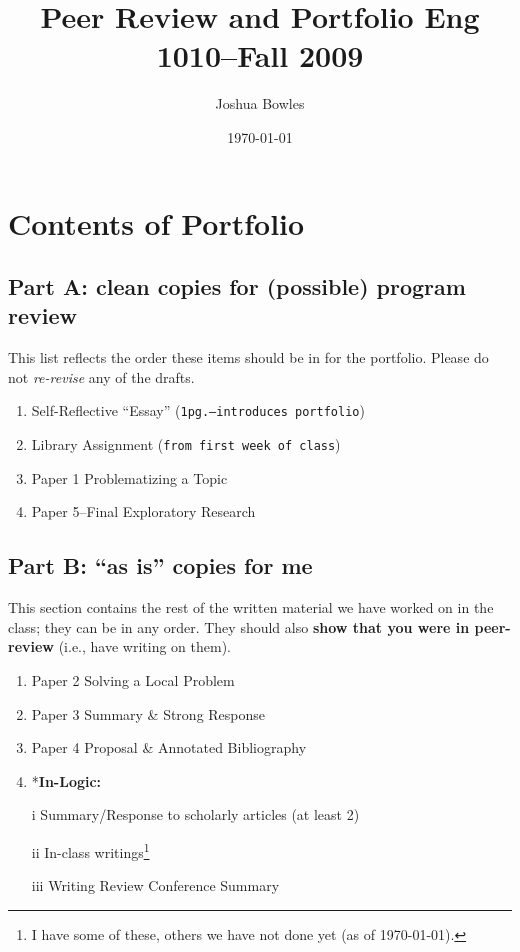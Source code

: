 \documentclass{article}
\theoremstyle{definition}
\begin{document}
\author{Joshua Bowles}
\title{Peer Review and Portfolio Eng 1010--Fall 2009}
\date{\today}

\maketitle

\section{Contents of Portfolio}
\subsection{Part A: clean copies for (possible) program review}
This list reflects the order these items should be in for the portfolio. Please do not \textsl{re-revise} any of the drafts.
\begin{enumerate}
\item Self-Reflective ``Essay'' (\texttt{1pg.--introduces portfolio})
\item Library Assignment (\texttt{from first week of class})
\item Paper 1 {\sc Problematizing a Topic}
\item Paper 5--Final {\sc Exploratory Research}
\end{enumerate}

\subsection{Part B: ``as is'' copies for me}
This section contains the rest of the written material we have worked on in the class; they can be in any order. They should also \textbf{show that you were in peer-review} (i.e., have writing on them).
\begin{enumerate}
\item Paper 2 {\sc Solving a Local Problem}
\item Paper 3 {\sc Summary \& Strong Response}
\item Paper 4 {\sc Proposal \& Annotated Bibliography}
\item *{\bf In-Logic:}
\item[i] Summary/Response to scholarly articles (at least 2)
\item[ii] In-class writings\footnote{I have some of these, others we have not done yet (as of \today).}
\item[iii] Writing Review Conference Summary
\end{enumerate}
\end{document}
